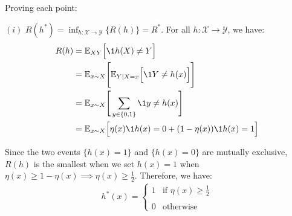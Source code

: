 \begin{proof*}
    Proving each point:

    \begin{subproof}{\newline $(i)$ $R(h^*) = \inf_{h:\mathcal{X}\to\mathcal{Y}}\{ R(h) \} = R^*$.}
        For all $h:\mathcal{X} \to \mathcal{Y}$, we have:
        \begin{align*}
            R(h) 
                &= \mathbb{E}_{XY} \Big[ \1{h(X) \ne Y} \Big] \\
                &= \mathbb{E}_{x\sim X}\Bigg[
                    \mathbb{E}_{Y|X=x} \Big[ \1{Y \ne h(x)} \Big]
                \Bigg] \\
                &= \mathbb{E}_{x\sim X}\Bigg[
                    \sum_{y\in\{0,1\}}\1{y \ne h(x)}
                \Bigg] \\
                &= \mathbb{E}_{x\sim X}\Big[ \eta(x)\1{h(x)=0} + (1 - \eta(x)) \1{h(x)=1} \Big]
        \end{align*}

        \noindent Since the two events $\{h(x)=1\}$ and $\{h(x)=0\}$ are mutually exclusive, $R(h)$ is the smallest when we set $h(x)=1$ when $\eta(x) \ge 1 - \eta(x)\implies \eta(x) \ge \frac{1}{2}$. Therefore, we have:
        \begin{align*}
            h^*(x) = \begin{cases}
                1 & \text{if } \eta(x) \ge \frac{1}{2}
                \\ \\
                0 & \text{otherwise}
            \end{cases}
        \end{align*} 
    \end{subproof}


\end{proof*}
